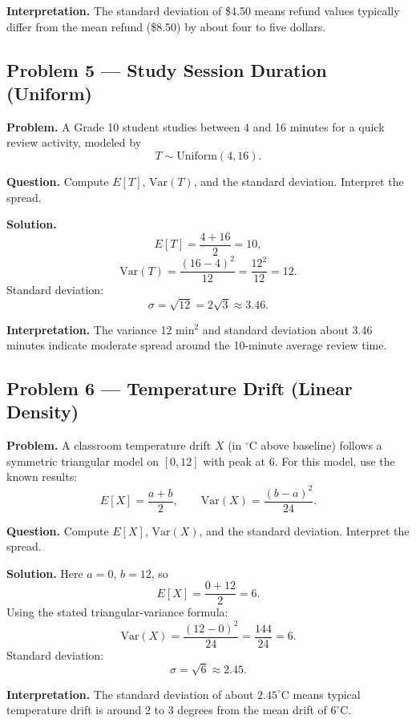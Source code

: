 \begin{ExamProblems}
\textbf{Interpretation.}
The standard deviation of \$4.50 means refund values typically differ from the mean refund (\$8.50) by about four to five dollars.


\item
\subsection*{Problem 5 — Study Session Duration (Uniform)}

\textbf{Problem.}
A Grade 10 student studies between 4 and 16 minutes for a quick review activity, modeled by
\[
T\sim \text{Uniform}(4,16).
\]

\textbf{Question.} Compute \(E[T]\), \(\mathrm{Var}(T)\), and the standard deviation. Interpret the spread.

\textbf{Solution.}
\[
E[T]=\frac{4+16}{2}=10,
\]
\[
\mathrm{Var}(T)=\frac{(16-4)^2}{12}=\frac{12^2}{12}=12.
\]
Standard deviation:
\[
\sigma=\sqrt{12}=2\sqrt{3}\approx 3.46.
\]

\textbf{Interpretation.}
The variance 12 \(\text{min}^2\) and standard deviation about 3.46 minutes indicate moderate spread around the 10-minute average review time.


\item
\subsection*{Problem 6 — Temperature Drift (Linear Density)}

\textbf{Problem.}
A classroom temperature drift \(X\) (in \(^\circ\)C above baseline) follows a symmetric triangular model on \([0,12]\) with peak at 6. For this model, use the known results:
\[
E[X]=\frac{a+b}{2},\qquad \mathrm{Var}(X)=\frac{(b-a)^2}{24}.
\]

\textbf{Question.} Compute \(E[X]\), \(\mathrm{Var}(X)\), and the standard deviation. Interpret the spread.

\textbf{Solution.}
Here \(a=0\), \(b=12\), so
\[
E[X]=\frac{0+12}{2}=6.
\]
Using the stated triangular-variance formula:
\[
\mathrm{Var}(X)=\frac{(12-0)^2}{24}=\frac{144}{24}=6.
\]
Standard deviation:
\[
\sigma=\sqrt{6}\approx 2.45.
\]

\textbf{Interpretation.}
The standard deviation of about \(2.45^\circ\)C means typical temperature drift is around 2 to 3 degrees from the mean drift of \(6^\circ\)C.


\end{ExamProblems}
